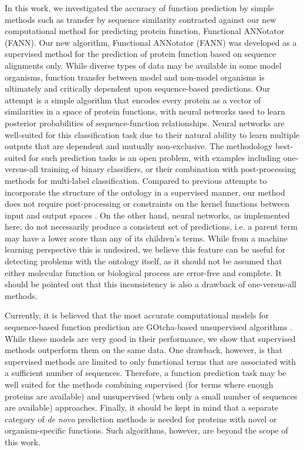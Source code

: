 In this work, we investigated the accuracy of function prediction by simple methods such as transfer by sequence similarity contrasted against our new computational method for predicting protein function, Functional ANNotator (FANN). Our new algorithm, Functional ANNotator (FANN) was developed as a supervised method for the prediction of protein function based on sequence alignments only. While diverse types of data may be available in some model organisms, function transfer between model and non-model organisms is ultimately and critically dependent upon sequence-based predictions. Our attempt is a simple algorithm that encodes every protein as a vector of similarities in a space of protein functions, with neural networks used to learn posterior probabilities of sequence-function relationships. Neural networks are well-suited for this classification task due to their natural ability to learn multiple outputs that are dependent and mutually non-exclusive. The methodology best-suited for such prediction tasks is an open problem, with examples including one-versus-all training of binary classifiers, or their combination with post-processing methods for multi-label classification. Compared to previous attempts to incorporate the structure of the ontology in a supervised manner, our method does not require post-processing \citep{Barutcuoglu2006} or constraints on the kernel functions between input and output spaces \citep{Sokolov2010}. On the other hand, neural networks, as implemented here, do not necessarily produce a consistent set of predictions, i.e. a parent term may have a lower score than any of its children's terms. While from a machine learning perspective this is undesired, we believe this feature can be useful for detecting problems with the ontology itself, as it should not be assumed that either molecular function or biological process are error-free and complete. It should be pointed out that this inconsistency is also a drawback of one-versus-all methods.

Currently, it is believed that the most accurate computational models for sequence-based function prediction are GOtcha-based unsupervised algorithms \citep{Friedberg2006c,Izarzugaza2007,Rentzsch2009}. While these models are very good in their performance, we show that supervised methods outperform them on the same data. One drawback, however, is that supervised methods are limited to only functional terms that are associated with a sufficient number of sequences. Therefore, a function prediction task may be well suited for the methods combining supervised (for terms where enough proteins are available) and unsupervised (when only a small number of sequences are available) approaches. Finally, it should be kept in mind that a separate category of \emph{de novo} prediction methods is needed for proteins with novel or organism-specific functions. Such algorithms, however, are beyond the scope of this work.

